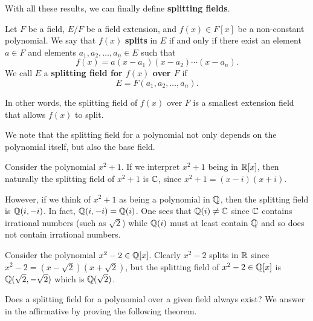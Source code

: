 With all these results, we can finally define \textbf{splitting fields}.

\begin{definition}
    Let $F$ be a field, $E/F$ be a field extension, and $f(x) \in F[x]$ be a non-constant polynomial. We say that $f(x)$ \textbf{splits} in $E$ if and only if there exist an element $a \in F$ and elements $a_1, a_2, \dots, a_n \in E$ such that
    \[
        f(x) = a(x-a_1)(x-a_2)\cdots(x-a_n).
    \]
    We call $E$ a \textbf{splitting field for $f(x)$ over $F$} if
    \[
        E = F(a_1, a_2, \dots, a_n).
    \]
\end{definition}
\begin{remark}
    In other words, the splitting field of $f(x)$ over $F$ is a smallest extension field that allows $f(x)$ to split.
\end{remark}

We note that the splitting field for a polynomial not only depends on the polynomial itself, but also the base field.

\begin{example}
    Consider the polynomial $x^2 + 1$. If we interpret $x^2 + 1$ being in $\mathbb{R}[x]$, then naturally the splitting field of $x^2 + 1$ is $\mathbb{C}$, since $x^2 + 1 = (x-i)(x+i)$.

    However, if we think of $x^2+1$ as being a polynomial in $\mathbb{Q}$, then the splitting field is $\mathbb{Q}(i, -i)$. In fact, $\mathbb{Q}(i, -i) = \mathbb{Q}(i)$. One sees that $\mathbb{Q}(i) \neq \mathbb{C}$ since $\mathbb{C}$ contains irrational numbers (such as $\sqrt2$) while $\mathbb{Q}(i)$ must at least contain $\mathbb{Q}$ and so does not contain irrational numbers.
\end{example}

\begin{example}
    Consider the polynomial $x^2 - 2 \in \mathbb{Q}[x]$. Clearly $x^2 - 2$ splits in $\mathbb{R}$ since $x^2 - 2 = (x - \sqrt2)(x + \sqrt2)$, but the splitting field of $x^2 - 2 \in \mathbb{Q}[x]$ is $\mathbb{Q}(\sqrt2, -\sqrt2)$ which is $\mathbb{Q}(\sqrt 2)$.
\end{example}

Does a splitting field for a polynomial over a given field always exist? We answer in the affirmative by proving the following theorem.

